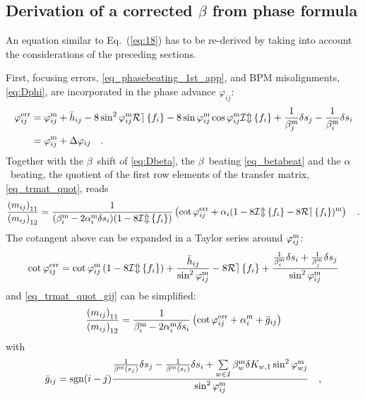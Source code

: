 \subsection{Derivation of a corrected \texorpdfstring{$\beta$}{beta} from phase formula}

An equation similar to Eq.~(\ref{eq:18}) has to be re-derived by taking into account the considerations
of the preceding sections.

First, focusing errors, \eqref{eq_phasebeating_1st_app},
and BPM misalignments, \eqref{eq:Dphi}, are incorporated in the phase advance $\varphi_{ij}$:
%
\begin{align}
    \varphi^\text{err}_{ij}  &=
    \varphi_{ij}^\text{m} + \bar{h}_{ij} - 8\sin^2\varphi_{ij}^\text{m}\mathcal{Re} \left\{ f_i \right\} - 8 \sin\varphi_{ij}^\text{m}\cos\varphi_{ij}^\text{m}\mathcal{Im} \left\{ f_i \right\}
    + \frac{1}{\beta_j^\text{m}}\delta s_j - \frac{1}{\beta_i^\text{m}}\delta s_i \notag \\
    &= \varphi_{ij}^\text{m} + \Delta\varphi_{ij}
    \quad .
    \label{eq_phi_err}
\end{align}
%
Together with the $\beta$~shift of \eqref{eq:Dbeta}, the $\beta$~beating \eqref{eq_betabeat} and the
$\alpha$~beating,
the quotient of the first row elements of the transfer matrix, \eqref{eq_trmat_quot}, reads
%
\begin{equation}
    \frac{
        \left(m_{ij}\right)_{11}
    }{
        \left(m_{ij}\right)_{12}
    }
    =
    \frac{1}{
        (\beta_i^\text{m} - 2\alpha_i^\text{m}\delta s_i)(1-8\mathcal{Im} \left\{ f_i \right\})} 
    \left(
        \cot \varphi_{ij}^\text{err} +  \alpha_i(1-8\mathcal{Im} \left\{ f_i \right\} -8\mathcal{Re} \left\{ f_i \right\}) ^\text{m}
    \right)
    \quad .
    \label{eq_trmat_quot_gij}
\end{equation}
%
The cotangent above can be expanded in a Taylor series around $\varphi_{ij}^\text{m}$:
%
\begin{equation}
        \cot\varphi_{ij}^\text{err}
        =\cot\varphi_{ij}^\text{m} \left( 1 - 8\mathcal{Im} \left\{ f_i \right\}\right) + \frac{\bar{h}_{ij}}{\sin^2\varphi_{ij}^\text{m}} - 8 \mathcal{Re} \left\{ f_i \right\}
        + \frac{\frac{1}{\beta_i^\text{m}}\delta s_i + \frac{1}{\beta_j^\text{m}}\delta s_j}{\sin^2\varphi_{ij}^\text{m}}
\end{equation}
%
and \eqref{eq_trmat_quot_gij} can be simplified:
%
\begin{align}
    \frac{
        \left(m_{ij}\right)_{11}
    }{
        \left(m_{ij}\right)_{12}
    }
    =
    \frac{1}{\beta_i^\text{m} - 2\alpha_i^\text{m}\delta s_i} 
    \left(
        \cot \varphi_{ij}^\text{err} + \alpha_i ^\text{m} + \bar{g}_{ij}
    \right)
\end{align}
%
with 
%
\begin{equation}
\bar{g}_{ij} = \text{sgn}(i-j)\dfrac{ \frac{1}{\beta^\text{m}(s_j)}\delta s_j - \frac{1}{\beta^\text{m}(s_i)}\delta s_i +
\sum\limits_{w \in I}\beta_w^\text{m}\delta K_{w,1}\sin^2\varphi_{wj}^\text{m}}{\sin^2\varphi_{ij}^\text{m}}\quad ,
\label{eq:g_ij}
\end{equation}
